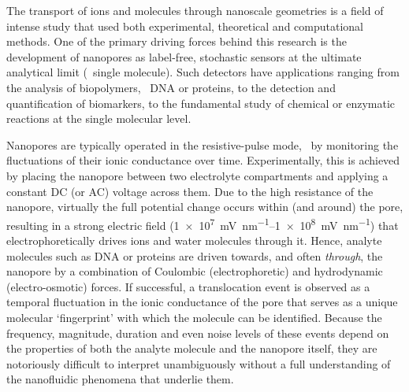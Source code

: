 \documentclass[journal=ancac3,manuscript=article,etalmode=truncate,maxauthors=0,layout=onecolumn]{achemso}
\begin{document}
The transport of ions and molecules through nanoscale geometries is a field of intense study that used both
experimental, theoretical and computational methods.\cite{Sparreboom-2010,Bocquet-2010,Maffeo-2012,
Thomas-2014,Wang-2014,Kim-2015} One of the primary driving forces behind this research is the development of
nanopores as label-free, stochastic sensors at the ultimate analytical limit (\ie{}~single molecule).
\cite{Bayley-2001,Dekker-2007,Venkatesan-2011,Zhang-2016} Such detectors have applications ranging from
the analysis of biopolymers,
\ie~DNA\cite{Deamer-2016,Kasianowicz-1996,Meller-2000,Maglia-2008,Butler-2008,Stoddart-2009,Franceschini-2013,Jain-2018}
or proteins,\cite{Restrepo-Perez-2018,Talaga-2009,Rodriguez-Larrea-2013, Nivala-2013,Kennedy-2016} to the
detection and quantification of
biomarkers,\cite{Chen-2013,Soskine-2012,Niedzwiecki-2013,VanMeervelt-2014,Huang-2017,Liu-2018,Galenkamp-2018}
to the fundamental study of chemical or enzymatic reactions at the single molecular
level.\cite{Willems-VanMeervelt-2017,Lieberman-2010, Nivala-2013,Ho-2015,Laszlo-2017}

Nanopores are typically operated in the resistive-pulse mode, \ie~by monitoring the fluctuations of their
ionic conductance over time.\cite{Bayley-2001,Dekker-2007,Maglia-2010,Venkatesan-2011} Experimentally, this is
achieved by placing the nanopore between two electrolyte compartments and applying a constant DC (or AC)
voltage across them. Due to the high resistance of the nanopore, virtually the full potential change occurs
within (and around) the pore, resulting in a strong electric field (\SIrange{1e7}{1e8}{\mV\per\nm}) that
electrophoretically drives ions and water molecules through
it.\cite{Wong-2007,Mao-2014,Haywood-2014,Laohakunakorn-2015} Hence, analyte molecules such as DNA or proteins
are driven towards, and often \emph{through}, the nanopore by a combination of Coulombic (electrophoretic) and
hydrodynamic (electro-osmotic) forces.\cite{Wong-2007,Grosberg-2010,Muthukumar-2010, Muthukumar-2014} If
successful, a translocation event is observed as a temporal fluctuation in the ionic conductance of the pore
that serves as a unique molecular `fingerprint' with which the molecule can be identified.\cite{Yusko-2017}
Because the frequency, magnitude, duration and even noise levels of these events depend on the properties of
both the analyte molecule and the nanopore itself, they are notoriously difficult to interpret unambiguously
without a full understanding of the nanofluidic phenomena that underlie them.
\end{document}

